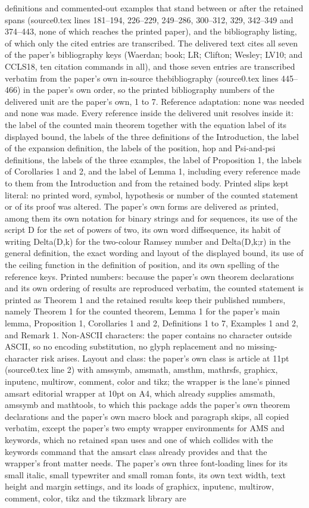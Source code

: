 \documentclass[10pt,a4paper]{amsart}
\begin{document}
definitions and commented-out examples that stand between or after the retained spans (source0.tex lines 181--194, 226--229, 249--286, 300--312, 329, 342--349 and 374--443, none of which reaches the printed paper), and the bibliography listing, of which only the cited entries are transcribed. The delivered text cites all seven of the paper's bibliography keys (Waerdan; book; LR; Clifton; Wesley; LV10; and CCLS18, ten citation commands in all), and those seven entries are transcribed verbatim from the paper's own in-source thebibliography (source0.tex lines 445--466) in the paper's own order, so the printed bibliography numbers of the delivered unit are the paper's own, 1 to 7. Reference adaptation: none was needed and none was made. Every reference inside the delivered unit resolves inside it: the label of the counted main theorem together with the equation label of its displayed bound, the labels of the three definitions of the Introduction, the label of the expansion definition, the labels of the position, hop and Psi-and-psi definitions, the labels of the three examples, the label of Proposition 1, the labels of Corollaries 1 and 2, and the label of Lemma 1, including every reference made to them from the Introduction and from the retained body. Printed slips kept literal: no printed word, symbol, hypothesis or number of the counted statement or of its proof was altered. The paper's own forms are delivered as printed, among them its own notation for binary strings and for sequences, its use of the script D for the set of powers of two, its own word diffsequence, its habit of writing Delta(D,k) for the two-colour Ramsey number and Delta(D,k;r) in the general definition, the exact wording and layout of the displayed bound, its use of the ceiling function in the definition of position, and its own spelling of the reference keys. Printed numbers: because the paper's own theorem declarations and its own ordering of results are reproduced verbatim, the counted statement is printed as Theorem 1 and the retained results keep their published numbers, namely Theorem 1 for the counted theorem, Lemma 1 for the paper's main lemma, Proposition 1, Corollaries 1 and 2, Definitions 1 to 7, Examples 1 and 2, and Remark 1. Non-ASCII characters: the paper contains no character outside ASCII, so no encoding substitution, no glyph replacement and no missing-character risk arises. Layout and class: the paper's own class is article at 11pt (source0.tex line 2) with amssymb, amsmath, amsthm, mathrsfs, graphicx, inputenc, multirow, comment, color and tikz; the wrapper is the lane's pinned amsart editorial wrapper at 10pt on A4, which already supplies amsmath, amssymb and mathtools, to which this package adds the paper's own theorem declarations and the paper's own macro block and paragraph skips, all copied verbatim, except the paper's two empty wrapper environments for AMS and keywords, which no retained span uses and one of which collides with the keywords command that the amsart class already provides and that the wrapper's front matter needs. The paper's own three font-loading lines for its small italic, small typewriter and small roman fonts, its own text width, text height and margin settings, and its loads of graphicx, inputenc, multirow, comment, color, tikz and the tikzmark library are 
\end{document}
